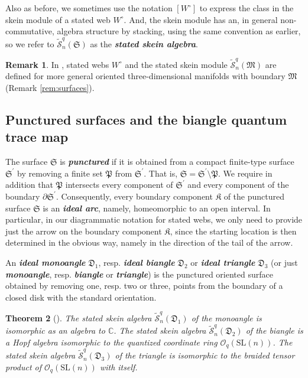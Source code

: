 \documentclass[12pt,
	]{amsart}
\newtheorem{theorem}{Theorem}[section]
\theoremstyle{definition}
\newtheorem{remark}[theorem]{Remark}
\renewcommand{\tilde}{\widetilde}
\newcommand{\mrm}[1]{\mathrm{#1}}
\newcommand{\mbb}[1]{\mathbb{#1}}
\newcommand{\mcal}[1]{\mathcal{#1}}
\newcommand{\mfrak}[1]{\mathfrak{#1}}
\newcommand{\define}[1]{{\textit{\textbf{#1}}}}
\newcommand{\class}[1]{\left[#1\right]}
\newcommand{\unbased}[1]{#1^\circ}
\newcommand{\C}{\mbb{C}}
\newcommand{\nsl}{\mrm{SL}(n)}
\newcommand{\man}{\mfrak{M}}
\newcommand{\surf}{\mfrak{S}}
\newcommand{\ssk}{\tilde{\mcal{S}}_n^q}
\newcommand{\punc}{\mfrak{P}}
\newcommand{\monoangle}{\mfrak{D}_1}
\newcommand{\biang}{\mfrak{D}_2}
\newcommand{\ttriang}{\mfrak{D}_3}
\newcommand{\comp}{\mfrak{K}}
\begin{document}
Also as before, we sometimes use the notation $\class{\unbased{W}}$ to express the class in the skein module of a stated web $\unbased{W}$.  And, the skein module has an, in general non-commutative, algebra structure by stacking, using the same convention as earlier, so we refer to $\ssk(\surf)$ as the \define{stated skein algebra}.  

\begin{remark}
In \cite{LeArxiv21}, stated webs $\unbased{W}$ and the stated skein module $\ssk(\man)$ are defined for more general oriented three-dimensional manifolds with boundary $\man$ (Remark \ref{rem:surfaces}).
\end{remark}

\subsection{Punctured surfaces and the biangle quantum trace map}\label{ssec:punctured-surfaces}

The surface $\surf$ is \define{punctured} if it is obtained from a compact finite-type surface $\surf^\prime$ by removing a finite set $\punc$ from $\surf^\prime$.  That is, $\surf=\surf^\prime\setminus\punc$.  We require in addition that $\punc$ intersects every component of $\surf^\prime$ and every component of the boundary $\partial \surf^\prime$. Consequently, every boundary component $\comp$ of the punctured surface $\surf$ is an \define{ideal arc}, namely, homeomorphic to  an open interval.  In particular, in our diagrammatic notation for stated webs, we only need to provide just the arrow on the boundary component $\comp$, since the starting location is then determined in the obvious way, namely in the direction of the tail of the arrow.  

An \define{ideal monoangle} $\monoangle$, resp. \define{ideal biangle} $\biang$ or \define{ideal triangle} $\ttriang$ (or just \define{monoangle}, resp. \define{biangle} or \define{triangle}) is the punctured oriented surface obtained by removing one, resp. two or three, points from the boundary of a closed disk with the standard orientation.  

\begin{theorem}[\cite{costantinoMR4493620,LeArxiv21}]\label{thm:monoanglebiangletriangle}
The stated skein algebra $\ssk(\monoangle)$ of the monoangle is isomorphic as an algebra to  $\C$.  The stated skein algebra $\ssk(\biang)$ of the biangle is a Hopf algebra isomorphic to the quantized coordinate ring $\mcal{O}_q(\nsl)$.  The stated skein algebra $\ssk(\ttriang)$ of the triangle is isomorphic to the braided tensor product of $\mcal{O}_q(\nsl)$ with itself.  
\end{theorem}
\end{document}
